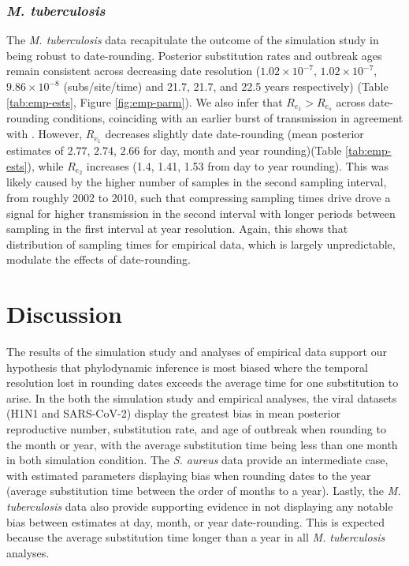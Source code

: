 \documentclass[12pt]{article}
\begin{document}
\begin{spacing}{2}
\subsubsection*{\textit{M. tuberculosis}}
The \textit{M. tuberculosis} data recapitulate the outcome of the simulation study in being robust to date-rounding. Posterior substitution rates and outbreak ages remain consistent across decreasing date resolution ($1.02\times10^{-7}$, $1.02\times10^{-7}$, $9.86\times10^{-8}$ (subs/site/time) and 21.7, 21.7, and 22.5 years respectively) (Table \ref{tab:emp-ests}, Figure \ref{fig:emp-parm}). We also infer that $R_{e_1} > R_{e_s}$ across date-rounding conditions, coinciding with an earlier burst of transmission in agreement with \citet{kuhnert_tuberculosis_2018}. However, $R_{e_1}$ decreases slightly date date-rounding (mean posterior estimates of $2.77$, $2.74$, $2.66$ for day, month and year rounding)(Table \ref{tab:emp-ests}), while $R_{e_2}$ increases (1.4, 1.41, 1.53 from day to year rounding). This was likely caused by the higher number of samples in the second sampling interval, from roughly 2002 to 2010, such that compressing sampling times drive drove a signal for higher transmission in the second interval with longer periods between sampling in the first interval at year resolution. Again, this shows that distribution of sampling times for empirical data, which is largely unpredictable, modulate the effects of date-rounding.

\section*{Discussion}
The results of the simulation study and analyses of empirical data support our hypothesis that phylodynamic inference is most biased where the temporal resolution lost in rounding dates exceeds the average time for one substitution to arise. In the both the simulation study and empirical analyses, the viral datasets (H1N1 and SARS-CoV-2) display the greatest bias in mean posterior reproductive number, substitution rate, and age of outbreak when rounding to the month or year, with the average substitution time being less than one month in both simulation condition. The \textit{S. aureus} data provide an intermediate case, with estimated parameters displaying bias when rounding dates to the year (average substitution time between the order of months to a year). Lastly, the \textit{M. tuberculosis} data also provide supporting evidence in not displaying any notable bias between estimates at day, month, or year date-rounding. This is expected because the average substitution time longer than a year in all \textit{M. tuberculosis} analyses.


\end{spacing}
\end{document}

